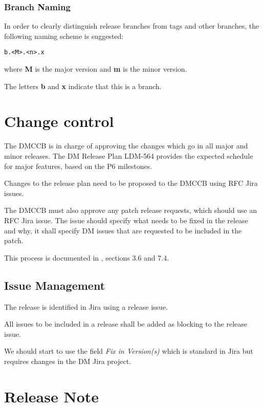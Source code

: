 \subsubsection{Branch Naming}

In order to clearly distinguish release branches from tags and other branches, the following naming scheme is suggested:

\begin{verbatim}
b.<M>.<n>.x
\end{verbatim}

where {\bf M} is the major version and {\bf m} is the minor version.

The letters {\bf b} and {\bf x} indicate that this is a branch.

\newpage
\section{Change control} \label{sec:changecontrol}

The DMCCB is in charge of approving the changes which go in  all major and minor releases.
The DM Release Plan LDM-564 provides the expected schedule for major features, based on the P6 milestones.

Changes to the release plan need to be proposed to the DMCCB using RFC Jira issues.

The DMCCB must  also  approve any  patch release requests,
which should  use an RFC Jira issue.
The issue should specify what needs to be fixed in the release and why, it shall specify DM issues that are requested to be included in the patch.

This process is documented in , sections 3.6 and 7.4.


\subsection{Issue Management} \label{sec:issues}

The release is identified in Jira using a release issue.

All issues to be included in a release shall be added as blocking to the release issue.

We should start to  use the field \textit{Fix in Version(s)} which is standard in Jira
but requires changes in the DM Jira project.


\newpage
\section{Release Note} \label{sec:relnote}

